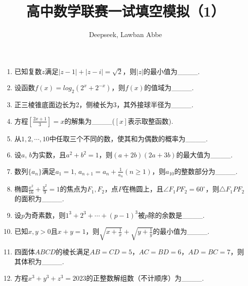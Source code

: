 \documentclass[a4paper,10pt,UTF8]{ctexart}
\title{高中数学联赛一试填空模拟（1）}
\author{Deepseek, Lawban Abbe}
\begin{document}
	
	\maketitle
	\begin{enumerate}
		\item 已知复数$z$满足$|z-1|+|z-i|=\sqrt{2}$，则$|z|$的最小值为\_\_\_\_.
		\item 设函数$f(x)=log_2(2^x+2^{-x})$，则$f(x)$的值域为\_\_\_\_.
		\item 正三棱锥底面边长为2，侧棱长为3，其外接球半径为\_\_\_\_.
		\item 方程$\left[\displaystyle\frac{2x+1}{3}\right]=x$的解集为\_\_\_\_($\left[x\right]$表示取整函数).
		\item 从$1,2,\cdots,10$中任取三个不同的数，使其和为偶数的概率为\_\_\_\_.
		\item 设$a$, $b$为实数，且$a^2+b^2=1$，则$(a+2b)(2a+3b)$的最大值为\_\_\_\_.
		\item 数列$\{a_n\}$满足$a_1=1$, $a_{n+1}=a_n+\displaystyle\frac{1}{a_n}(n\ge 1)$，则$a_{10}$的整数部分为\_\_\_\_.
		\item 椭圆$\displaystyle\frac{x^2}{16}+\displaystyle\frac{y^2}{9}=1$的焦点为$F_1, F_2$，点$P$在椭圆上，且$\angle F_1PF_2=60^\circ$，则$\triangle F_1PF_2$的面积为\_\_\_\_.
		\item 设$p$为奇素数，则$1^3+2^3+\cdots+(p-1)^3$被$p$除的余数是\_\_\_\_.
		\item 已知$x,y>0$且$x+y=1$，则$\sqrt{x+\displaystyle\frac{1}{x}}+\sqrt{y+\displaystyle\frac{1}{y}}$的最小值为\_\_\_\_.
		\item 四面体$ABCD$的棱长满足$AB=CD=5$，$AC=BD=6$，$AD=BC=7$，则其体积为\_\_\_\_.
		\item 方程$x^3+y^3+z^3=2023$的正整数解组数（不计顺序）为\_\_\_\_.
		
	\end{enumerate}
\end{document}
